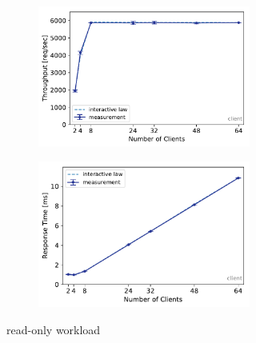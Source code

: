 \documentclass[report.tex]{subfiles}
\begin{document}
\begin{figure}[H]
\begin{subfigure}{\linewidth}
	\begin{subfigure}[b]{.49\linewidth}
		\centering
		\includegraphics[width=\linewidth]{data/exp22_ro_tp_nc.pdf}
	\end{subfigure}\hfill
	\begin{subfigure}[b]{.49\linewidth}
		\centering
		\includegraphics[width=\linewidth]{data/exp22_ro_rt_nc.pdf}
	\end{subfigure}%
	\caption{read-only workload}
	\label{exp22_ro_nc}
\end{subfigure}
\\[1ex]
\begin{subfigure}{\linewidth}
	\begin{subfigure}[b]{.49\linewidth}
		\centering

\end{subfigure}
\end{subfigure}
\end{figure}
\end{document}
